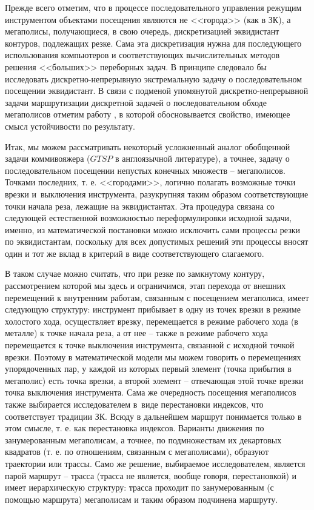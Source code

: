 \documentclass[11pt,twoside,openany]{report}
\begin{document}
Прежде всего отметим,
что в процессе последовательного управления
режущим инструментом объектами посещения
являются не <<города>>
(как в ЗК),
а мегаполисы, получающиеся,
в свою очередь,
дискретизацией эквидистант контуров,
подлежащих резке.
Сама эта дискретизация нужна для последующего
использования компьютеров и соответствующих
вычислительных методов решения <<больших>> переборных задач.
В принципе следовало бы исследовать
дискретно-непрерывную экстремальную задачу
о последовательном посещении эквидистант.
В связи с подменой упомянутой
дискретно-непрерывной задачи маршрутизации
дискретной задачей о последовательном обходе
мегаполисов отметим работу
\cite{intro01},
в которой обосновывается свойство,
имеющее смысл устойчивости по результату.

Итак,
мы можем рассматривать некоторый усложненный аналог
обобщенной задачи коммивояжера
($GTSP$ в англоязычной литературе),
а точнее,
задачу о последовательном посещении
непустых конечных множеств -- мегаполисов.
Точками последних,
т. е. <<городами>>,
логично полагать возможные точки врезки
и~выключения инструмента,
разукрупняя таким образом соответствующие точки начала реза,
лежащие на эквидистантах.
Эта процедура связана со следующей
естественной возможностью переформулировки исходной задачи,
именно,
из математической постановки
можно исключить сами процессы резки по эквидистантам,
поскольку для всех допустимых решений
эти процессы вносят один и тот же вклад
в критерий в виде соответствующего слагаемого.

В таком случае можно считать,
что при резке по замкнутому контуру,
рассмотрением которой мы здесь и ограничимся,
этап перехода от внешних перемещений к внутренним работам,
связанным с посещением мегаполиса,
имеет следующую структуру:
инструмент прибывает в одну из точек врезки
в режиме холостого хода,
осуществляет врезку,
перемещается в режиме рабочего хода
(в металле)
к точке начала реза,
а от нее -- также в режиме рабочего хода
перемещается к точке выключения инструмента,
связанной с исходной точкой врезки.
Поэтому в математической модели
мы можем
говорить о перемещениях упорядоченных пар,
у каждой из которых первый элемент
(точка прибытия в мегаполис)
есть точка врезки, а второй элемент --
отвечающая этой точке врезки
точка выключения инструмента.
Сама же очередность посещения мегаполисов
также выбирается исследователем
в~виде перестановки индексов,
что соответствует традиции ЗК.
Всюду в дальнейшем маршрут понимается
только в этом смысле,
т. е. как перестановка индексов.
Варианты движения по занумерованным мегаполисам,
а точнее,
по подмножествам их декартовых квадратов
(т. е. по отношениям, связанным с мегаполисами),
образуют траектории или трассы.
Само же решение, выбираемое исследователем,
является парой маршрут -- трасса
(трасса не является, вообще говоря, перестановкой)
и имеет иерархическую структуру:
трасса проходит по занумерованным
(с помощью маршрута) мегаполисам
и таким образом подчинена маршруту.
\end{document}
